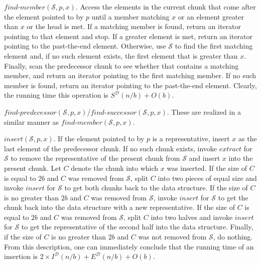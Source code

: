 \documentclass{DIKU-article}
\newcommand{\Member}{\mbox{$\mathit{find}$\textnormal{-}}\allowbreak{}\mbox{$\mathit{member}$}}
\newcommand{\Predecessor}{\mbox{$\mathit{find}$\textnormal{-}}\allowbreak{}\mbox{$\mathit{predecessor}$}}
\newcommand{\Successor}{\mbox{$\mathit{find}$\textnormal{-}}\allowbreak{}\mbox{$\mathit{successor}$}}
\newcommand{\Insert}{\mbox{$\mathit{insert}$}}
\newcommand{\Extract}{\mbox{$\mathit{extract}$}}
\begin{document}
\Member{}$(\mathcal{S}, p, x)$.  Access the elements in the current
chunk that come after the element pointed to by $p$ until a member
matching $x$ or an element greater than $x$ or the head is met. If a
matching member is found, return an iterator pointing to that element
and stop. If a greater element is met, return an iterator pointing to
the past-the-end element. Otherwise, use $\mathcal{S}$ to find the
first matching element and, if no such element exists, the first
element that is greater than $x$. Finally, scan the predecessor chunk
to see whether that contains a matching member, and return an iterator
pointing to the first matching member. If no such member is found,
return an iterator pointing to the past-the-end element.  Clearly, the
running time this operation is $S^{\mathcal{D}}(n/b) + O(b)$.

\Predecessor{}$(\mathcal{S}, p, x)$/\Successor{}$(\mathcal{S}, p, x)$.
These are realized in a similar manner as \Member$(\mathcal{S}, p,
x)$.

\Insert{}$(\mathcal{S}, p, x)$. If the element pointed to by $p$ is a
representative, insert $x$ as the last element of the predecessor
chunk. If no such chunk exists, invoke \Extract{} for $\mathcal{S}$
to remove the representative of the present chunk from $\mathcal{S}$
and insert $x$ into the present chunk. Let $C$ denote the chunk into
which $x$ was inserted.
  If the size of $C$ is equal to $2b$ and  $C$ was
removed from $\mathcal{S}$, split $C$ into two pieces of equal size
and invoke \Insert{} for $\mathcal{S}$ to get both chunks back to the
data structure.
  If the size of $C$ is no greater than $2b$
and  $C$ was removed from $\mathcal{S}$, invoke \Insert{} for
$\mathcal{S}$ to get the chunk back into the data structure with a new
representative. 
  If the size of $C$ is equal to $2b$ and $C$ was removed from
$\mathcal{S}$, split $C$ into two halves and invoke \Insert{} for
$\mathcal{S}$ to get the representative of the second half into the
data structure.
  Finally, if the size of $C$ is no greater than $2b$ and $C$ was not removed
from $\mathcal{S}$, do nothing.
{}From this description, one can immediately conclude that the
running time of an insertion is 
$2\times I^{\mathcal{D}}(n/b) + E^{\mathcal{D}}(n/b) + O(b)$.
\end{document}
